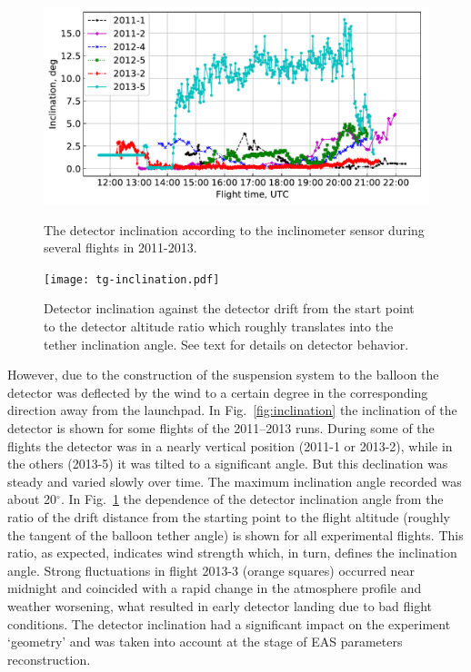 \documentclass[preprint,5p,times]{elsarticle}
\begin{document}
\begin{figure}[tb]
    \begin{minipage}[t]{0.48\textwidth}
    \centering
       \includegraphics[width=\textwidth]{Telemetry_inclination.pdf}
       \caption{The detector inclination according to the inclinometer sensor during several flights in 2011-2013.}
    \label{fig:inclination} 
    \end{minipage}
    \hfill
    \begin{minipage}[t]{0.48\textwidth}
    \centering
       \texttt{[image: tg-inclination.pdf]}
       \caption{Detector inclination against the detector drift from the start point to the detector altitude ratio which roughly translates into the tether inclination angle. See text for details on detector behavior.}
\label{fig:drift-inclination}
   
    \end{minipage}
\end{figure}

However, due to the construction of the suspension system to the balloon the detector was deflected by the wind to a certain degree in the corresponding direction away from the launchpad. In Fig.~\ref{fig:inclination} the inclination of the detector is shown for some flights of the 2011--2013 runs. During some of the flights the detector was in a nearly vertical position (2011-1 or 2013-2), while in the others (2013-5) it was tilted to a significant angle. But this declination was steady and varied slowly over time. The maximum inclination angle recorded was about 20$^\circ$. In Fig.~\ref{fig:drift-inclination} the dependence of the detector inclination angle from the ratio of the drift distance from the starting point to the flight altitude (roughly the tangent of the balloon tether angle) is shown for all experimental flights. This ratio, as expected, indicates wind strength which, in turn, defines the inclination angle. Strong fluctuations in flight 2013-3 (orange squares) occurred near midnight and coincided with a rapid change in the atmosphere profile and weather worsening, what resulted in early detector landing due to bad flight conditions. The detector inclination had a significant impact on the experiment `geometry' and was taken into account at the stage of EAS parameters reconstruction.
\end{document}

